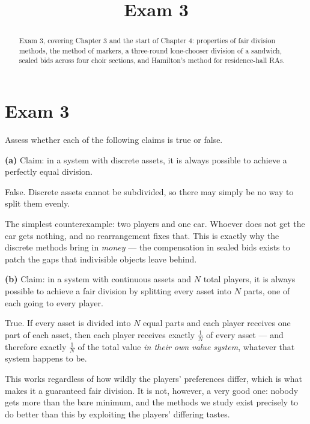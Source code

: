 \documentclass[12pt]{ximera}
\title{Exam 3}
\begin{document}
\begin{abstract}
Exam 3, covering Chapter 3 and the start of Chapter 4: properties of fair division
methods, the method of markers, a three-round lone-chooser division of a sandwich, sealed
bids across four choir sections, and Hamilton's method for residence-hall RAs.
\end{abstract}
\maketitle

\section*{Exam 3}

\begin{problem}
Assess whether each of the following claims is true or false.

\begin{prompt}
\textbf{(a)} Claim: in a system with discrete assets, it is always possible to achieve a
perfectly equal division.

\begin{multipleChoice}
\end{multipleChoice}

\begin{feedback}
False. Discrete assets cannot be subdivided, so there may simply be no way to split
them evenly.

The simplest counterexample: two players and one car. Whoever does not get the car gets
nothing, and no rearrangement fixes that. This is exactly why the discrete methods bring
in \emph{money} --- the compensation in sealed bids exists to patch the gaps that
indivisible objects leave behind.
\end{feedback}
\end{prompt}

\begin{prompt}
\textbf{(b)} Claim: in a system with continuous assets and $N$ total players, it is
always possible to achieve a fair division by splitting every asset into $N$ parts, one
of each going to every player.

\begin{multipleChoice}
\end{multipleChoice}

\begin{feedback}
True. If every asset is divided into $N$ equal parts and each player receives one part
of each asset, then each player receives exactly $\frac1N$ of every asset --- and
therefore exactly $\frac1N$ of the total value \emph{in their own value system},
whatever that system happens to be.

This works regardless of how wildly the players' preferences differ, which is what makes
it a guaranteed fair division. It is not, however, a very good one: nobody gets more
than the bare minimum, and the methods we study exist precisely to do better than this
by exploiting the players' differing tastes.
\end{feedback}
\end{prompt}
\end{problem}
\end{document}
